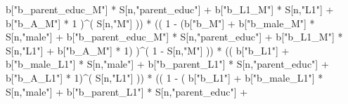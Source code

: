 \documentclass[
]{book}
\newenvironment{Shaded}{\begin{snugshade}}{\end{snugshade}}
\newcommand{\DecValTok}[1]{\textcolor[rgb]{0.00,0.00,0.81}{#1}}
\newcommand{\NormalTok}[1]{#1}
\newcommand{\SpecialCharTok}[1]{\textcolor[rgb]{0.00,0.00,0.00}{#1}}
\newcommand{\StringTok}[1]{\textcolor[rgb]{0.31,0.60,0.02}{#1}}
\begin{document}
\begin{Shaded}
\begin{Highlighting}[]
\NormalTok{                             b[}\StringTok{"b\_parent\_educ\_M"}\NormalTok{] }\SpecialCharTok{*}\NormalTok{ S[n,}\StringTok{"parent\_educ"}\NormalTok{] }\SpecialCharTok{+} 
\NormalTok{                             b[}\StringTok{"b\_L1\_M"}\NormalTok{] }\SpecialCharTok{*}\NormalTok{ S[n,}\StringTok{"L1"}\NormalTok{] }\SpecialCharTok{+}
\NormalTok{                             b[}\StringTok{"b\_A\_M"}\NormalTok{] }\SpecialCharTok{*} \DecValTok{1}\NormalTok{ )}\SpecialCharTok{\^{}}\NormalTok{( S[n,}\StringTok{"M"}\NormalTok{] )) }\SpecialCharTok{*}
\NormalTok{                        (( }\DecValTok{1} \SpecialCharTok{{-}}\NormalTok{ (b[}\StringTok{"b\_M"}\NormalTok{] }\SpecialCharTok{+} 
\NormalTok{                                  b[}\StringTok{"b\_male\_M"}\NormalTok{] }\SpecialCharTok{*}\NormalTok{ S[n,}\StringTok{"male"}\NormalTok{] }\SpecialCharTok{+} 
\NormalTok{                                  b[}\StringTok{"b\_parent\_educ\_M"}\NormalTok{] }\SpecialCharTok{*}\NormalTok{ S[n,}\StringTok{"parent\_educ"}\NormalTok{] }\SpecialCharTok{+} 
\NormalTok{                                  b[}\StringTok{"b\_L1\_M"}\NormalTok{] }\SpecialCharTok{*}\NormalTok{ S[n,}\StringTok{"L1"}\NormalTok{] }\SpecialCharTok{+}
\NormalTok{                                  b[}\StringTok{"b\_A\_M"}\NormalTok{] }\SpecialCharTok{*} \DecValTok{1}\NormalTok{) )}\SpecialCharTok{\^{}}\NormalTok{( }\DecValTok{1} \SpecialCharTok{{-}}\NormalTok{ S[n,}\StringTok{"M"}\NormalTok{] )) }\SpecialCharTok{*}
\NormalTok{                        (( b[}\StringTok{"b\_L1"}\NormalTok{] }\SpecialCharTok{+}
\NormalTok{                             b[}\StringTok{"b\_male\_L1"}\NormalTok{] }\SpecialCharTok{*}\NormalTok{ S[n,}\StringTok{"male"}\NormalTok{] }\SpecialCharTok{+}  
\NormalTok{                             b[}\StringTok{"b\_parent\_L1"}\NormalTok{] }\SpecialCharTok{*}\NormalTok{ S[n,}\StringTok{"parent\_educ"}\NormalTok{] }\SpecialCharTok{+}
\NormalTok{                             b[}\StringTok{"b\_A\_L1"}\NormalTok{] }\SpecialCharTok{*} \DecValTok{1}\NormalTok{)}\SpecialCharTok{\^{}}\NormalTok{( S[n,}\StringTok{"L1"}\NormalTok{] )) }\SpecialCharTok{*}
\NormalTok{                        (( }\DecValTok{1} \SpecialCharTok{{-}}\NormalTok{ ( b[}\StringTok{"b\_L1"}\NormalTok{] }\SpecialCharTok{+}
\NormalTok{                                   b[}\StringTok{"b\_male\_L1"}\NormalTok{] }\SpecialCharTok{*}\NormalTok{ S[n,}\StringTok{"male"}\NormalTok{] }\SpecialCharTok{+}  
\NormalTok{                                   b[}\StringTok{"b\_parent\_L1"}\NormalTok{] }\SpecialCharTok{*}\NormalTok{ S[n,}\StringTok{"parent\_educ"}\NormalTok{] }\SpecialCharTok{+}

\end{Highlighting}
\end{Shaded}
\end{document}
